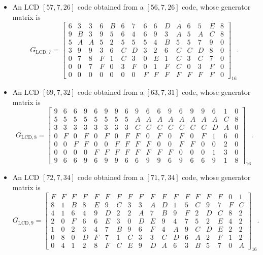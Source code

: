 \documentclass{article}
\theoremstyle{definition}
\theoremstyle{remark}
\begin{document}
\begin{itemize}
\item An LCD $[57,7,26]$ code obtained from a $[56,7,26]$ code, whose generator matrix is
{\tiny
\[
G_{\mathrm{LCD, 7}}=\left[
\begin{array}{ccccccccccccccc}
6 & 3 & 3 & 6 & B & 6 & 7 & 6 & 6 & D & A & 6 & 5 & E & 8 \\
9 & B & 3 & 9 & 5 & 6 & 4 & 6 & 9 & 3 & A & 5 & A & C & 8 \\
5 & A & A & 5 & 2 & 5 & 5 & 5 & 4 & B & 5 & 5 & 7 & 9 & 0 \\
3 & 9 & 9 & 3 & 6 & C & D & 3 & 2 & 6 & C & C & D & 8 & 0 \\
0 & 7 & 8 & F & 1 & C & 3 & 0 & E & 1 & C & 3 & C & 7 & 0 \\
0 & 0 & 7 & F & 0 & 3 & F & 0 & 1 & F & C & 0 & 3 & F & 0 \\
0 & 0 & 0 & 0 & 0 & 0 & 0 & F & F & F & F & F & F & F & 0
\end{array}
\right]_{16}.
\]
}

\item An LCD $[69,7,32]$ code obtained from a $[63,7,31]$ code, whose generator matrix is
{\tiny
\[
G_{\mathrm{LCD, 8}}=\left[
\begin{array}{cccccccccccccccccc}
9 & 6 & 6 & 9 & 6 & 9 & 9 & 6 & 9 & 6 & 6 & 9 & 6 & 9 & 9 & 6 & 1 & 0 \\
5 & 5 & 5 & 5 & 5 & 5 & 5 & 5 & A & A & A & A & A & A & A & A & C & 8 \\
3 & 3 & 3 & 3 & 3 & 3 & 3 & 3 & C & C & C & C & C & C & C & D & A & 0 \\
0 & F & 0 & F & 0 & F & 0 & F & F & 0 & F & 0 & F & 0 & F & 1 & 6 & 0 \\
0 & 0 & F & F & 0 & 0 & F & F & F & F & 0 & 0 & F & F & 0 & 0 & 2 & 0 \\
0 & 0 & 0 & 0 & F & F & F & F & F & F & F & F & 0 & 0 & 0 & 1 & 3 & 0 \\
9 & 6 & 6 & 9 & 6 & 9 & 9 & 6 & 6 & 9 & 9 & 6 & 9 & 6 & 6 & 9 & 1 & 8
\end{array}
\right]_{16}.
\]
}

\item An LCD $[72,7,34]$ code obtained from a $[71,7,34]$ code, whose generator matrix is
{\tiny
\[
G_{\mathrm{LCD, 9}}=\left[
\begin{array}{cccccccccccccccccc}
F & F & F & F & F & F & F & F & F & F & F & F & F & F & F & F & 0 & 1 \\
8 & 1 & B & 8 & E & 9 & C & 3 & 3 & A & D & 1 & 5 & C & 9 & 7 & F & C \\
4 & 1 & 6 & 4 & 9 & D & 2 & 2 & A & 7 & B & 9 & F & 2 & D & C & 8 & 2 \\
2 & 0 & F & 6 & 6 & E & 3 & 0 & D & E & 9 & 4 & 7 & 5 & 2 & E & 4 & 2 \\
1 & 0 & 2 & 3 & 4 & 7 & B & 9 & 6 & F & 4 & A & 9 & C & D & E & 2 & 2 \\
0 & 8 & 0 & D & F & 7 & 1 & C & 3 & 3 & C & D & 6 & A & 2 & F & 1 & 2 \\
0 & 4 & 1 & 2 & 8 & F & C & E & 9 & D & A & 6 & 3 & B & 5 & 7 & 0 & A
\end{array}
\right]_{16}.
\]
}


\end{itemize}
\end{document}

